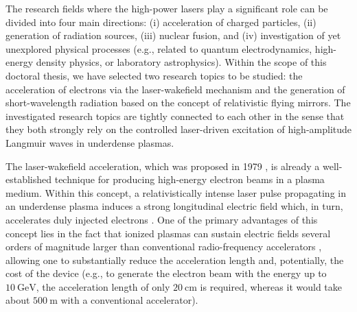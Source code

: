 \documentclass[10pt, a4paper, twoside, openright]{report}
\begin{document}
The research fields where the high-power lasers play a significant role can be divided into four main directions: (i) acceleration of charged particles, (ii) generation of radiation sources, (iii) nuclear fusion, and (iv) investigation of yet unexplored physical processes (e.g., related to quantum electrodynamics, high-energy density physics, or laboratory astrophysics). Within the scope of this doctoral thesis, we have selected two research topics to be studied: the acceleration of electrons via the laser-wakefield mechanism and the generation of short-wavelength radiation based on the concept of relativistic flying mirrors. The investigated research topics are tightly connected to each other in the sense that they both strongly rely on the controlled laser-driven excitation of high-amplitude Langmuir waves in underdense plasmas.

The laser-wakefield acceleration, which was proposed in 1979 \cite{Tajima1979}, is already a well-established technique for producing high-energy electron beams in a plasma medium. Within this concept, a relativistically intense laser pulse propagating in an underdense plasma induces a strong longitudinal electric field which, in turn, accelerates duly injected electrons \cite{Esarey1996, Esarey2009, Hooker2013, Bulanov2016}. One of the primary advantages of this concept lies in the fact that ionized plasmas can sustain electric fields several orders of magnitude larger than conventional radio-frequency accelerators \cite{Dawson1959}, allowing one to substantially reduce the acceleration length and, potentially, the cost of the device (e.g., to generate the electron beam with the energy up to $ 10 \ \mathrm{GeV} $, the acceleration length of only $ 20 \ \mathrm{cm} $ is required, whereas it would take about $ 500 \ \mathrm{m} $ with a conventional accelerator).
\end{document}
